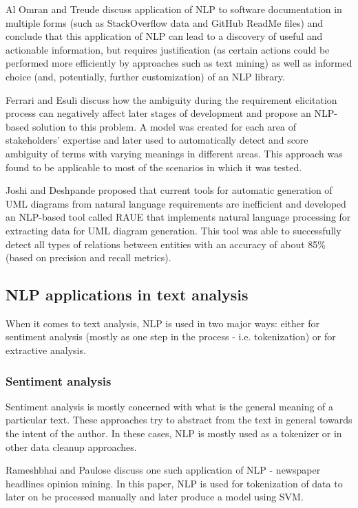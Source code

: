 \documentclass[conference]{IEEEtran}
\begin{document}
Al Omran and Treude \cite{lr-2} discuss application of NLP to software documentation in multiple forms (such as StackOverflow data and GitHub ReadMe files) and conclude that this application of NLP can lead to a discovery of useful and actionable information, but requires justification (as certain actions could be performed more efficiently by approaches such as text mining) as well as informed choice (and, potentially, further customization) of an NLP library.

Ferrari and Esuli \cite{lr-3} discuss how the ambiguity during the requirement elicitation process can negatively affect later stages of development and propose an NLP-based solution to this problem. A model was created for each area of stakeholders' expertise and later used to automatically detect and score ambiguity of terms with varying meanings in different areas. This approach was found to be applicable to most of the scenarios in which it was tested.

Joshi and Deshpande \cite{lr-4} proposed that current tools for automatic generation of UML diagrams from natural language requirements are inefficient and developed an NLP-based tool called RAUE that implements natural language processing for extracting data for UML diagram generation. This tool was able to successfully detect all types of relations between entities with an accuracy of about 85\% (based on precision and recall metrics).

\subsection{NLP applications in text analysis}

When it comes to text analysis, NLP is used in two major ways: either for sentiment analysis (mostly as one step in the process - i.e. tokenization) or for extractive analysis.

\subsubsection{Sentiment analysis}
Sentiment analysis is mostly concerned with what is the general meaning of a particular text. These approaches try to abstract from the text in general towards the intent of the author. In these cases, NLP is mostly used as a tokenizer or in other data cleanup approaches.

Rameshbhai and Paulose \cite{lr-5} discuss one such application of NLP - newspaper headlines opinion mining. In this paper, NLP is used for tokenization of data to later on be processed manually and later produce a model using SVM.
\end{document}
